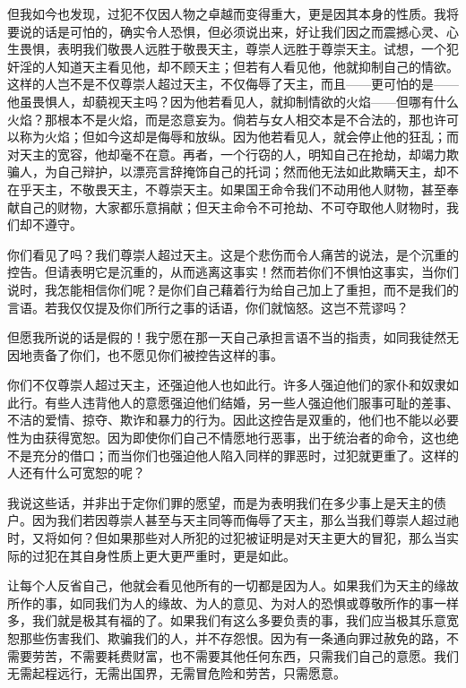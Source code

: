 但我如今也发现，过犯不仅因人物之卓越而变得重大，更是因其本身的性质。我将要说的话是可怕的，确实令人恐惧，但必须说出来，好让我们因之而震撼心灵、心生畏惧，表明我们敬畏人远胜于敬畏天主，尊崇人远胜于尊崇天主。试想，一个犯奸淫的人知道天主看见他，却不顾天主；但若有人看见他，他就抑制自己的情欲。这样的人岂不是不仅尊崇人超过天主，不仅侮辱了天主，而且——更可怕的是——他虽畏惧人，却藐视天主吗？因为他若看见人，就抑制情欲的火焰——但哪有什么火焰？那根本不是火焰，而是恣意妄为。倘若与女人相交本是不合法的，那也许可以称为火焰；但如今这却是侮辱和放纵。因为他若看见人，就会停止他的狂乱；而对天主的宽容，他却毫不在意。再者，一个行窃的人，明知自己在抢劫，却竭力欺骗人，为自己辩护，以漂亮言辞掩饰自己的托词；然而他无法如此欺瞒天主，却不在乎天主，不敬畏天主，不尊崇天主。如果国王命令我们不动用他人财物，甚至奉献自己的财物，大家都乐意捐献；但天主命令不可抢劫、不可夺取他人财物时，我们却不遵守。\par

你们看见了吗？我们尊崇人超过天主。这是个悲伤而令人痛苦的说法，是个沉重的控告。但请表明它是沉重的，从而逃离这事实！然而若你们不惧怕这事实，当你们说时，我怎能相信你们呢？是你们自己藉着行为给自己加上了重担，而不是我们的言语。若我仅仅提及你们所行之事的话语，你们就恼怒。这岂不荒谬吗？\par

但愿我所说的话是假的！我宁愿在那一天自己承担言语不当的指责，如同我徒然无因地责备了你们，也不愿见你们被控告这样的事。\par

你们不仅尊崇人超过天主，还强迫他人也如此行。许多人强迫他们的家仆和奴隶如此行。有些人违背他人的意愿强迫他们结婚，另一些人强迫他们服事可耻的差事、不洁的爱情、掠夺、欺诈和暴力的行为。因此这控告是双重的，他们也不能以必要性为由获得宽恕。因为即使你们自己不情愿地行恶事，出于统治者的命令，这也绝不是充分的借口；而当你们也强迫他人陷入同样的罪恶时，过犯就更重了。这样的人还有什么可宽恕的呢？\par

我说这些话，并非出于定你们罪的愿望，而是为表明我们在多少事上是天主的债户。因为我们若因尊崇人甚至与天主同等而侮辱了天主，那么当我们尊崇人超过祂时，又将如何？但如果那些对人所犯的过犯被证明是对天主更大的冒犯，那么当实际的过犯在其自身性质上更大更严重时，更是如此。\par

让每个人反省自己，他就会看见他所有的一切都是因为人。如果我们为天主的缘故所作的事，如同我们为人的缘故、为人的意见、为对人的恐惧或尊敬所作的事一样多，我们就是极其有福的了。如果我们有这么多要负责的事，我们应当极其乐意宽恕那些伤害我们、欺骗我们的人，并不存怨恨。因为有一条通向罪过赦免的路，不需要劳苦，不需要耗费财富，也不需要其他任何东西，只需我们自己的意愿。我们无需起程远行，无需出国界，无需冒危险和劳苦，只需愿意。\par

